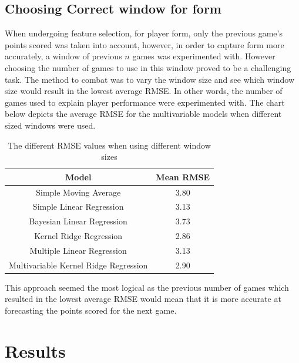 \documentclass[a4paper,11pt,twoside]{article}
\begin{document}
\subsection{Choosing Correct window for form}
When undergoing feature selection, for player form, only the previous game's points scored was taken into account, however, in order to capture form more accurately, a window of previous $n$ games was experimented with. However choosing the number of games to use in this window proved to be a challenging task. The method to combat was to vary the window size and see which window size would result in the lowest average RMSE. In other words, the number of games used to explain player performance were experimented with. The chart below depicts the average RMSE for the multivariable models when different sized windows were used. 
\vspace{5mm}
\begin{table}[h!]
\captionsetup{justification=centering}
\begin{center}
\begin{tabular}{ |c|c|} 
 \hline
     \textbf{Model} & \textbf{Mean RMSE}\\ 
 \hline
 Simple Moving Average  & 3.80\\ 
 \hline
 Simple Linear Regression & 3.13\\ 
 \hline
 Bayesian Linear Regression  & 3.73 \\
 \hline
 Kernel Ridge Regression  & 2.86\\
 \hline
 Multiple Linear Regression& 3.13\\
 \hline
 Multivariable Kernel Ridge Regression  & 2.90\\
 \hline
\end{tabular}
\end{center}
\caption{The different RMSE values when using different window sizes}
\end{table}
\vspace{5mm}

This approach seemed the most logical as the previous number of games which resulted in the lowest average RMSE would mean that it is more accurate at forecasting the points scored for the next game.

\newpage

\section{Results}
\end{document}
